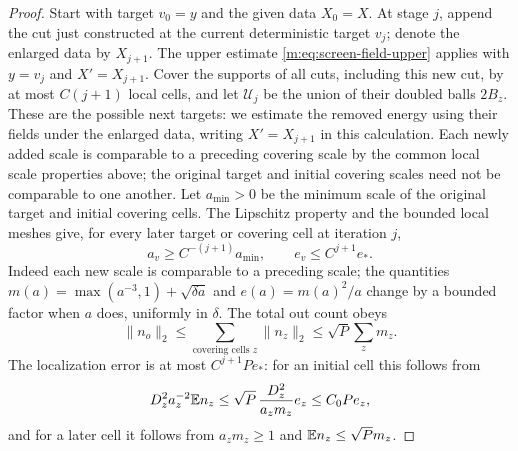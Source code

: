 \begin{proof}
Start with target $v_0=y$ and the given data $X_0=X$.  At stage $j$,
append the cut just constructed at the current deterministic target
$v_j$; denote the enlarged data by $X_{j+1}$.  The upper estimate
\eqref{m:eq:screen-field-upper} applies with $y=v_j$ and
$X'=X_{j+1}$.  Cover the supports of all cuts, including this new cut,
by at most $C(j+1)$ local cells, and let $\mathcal U_j$ be the union
of their doubled balls $2B_z$.  These are the possible next targets:
we estimate the removed energy using their fields under the enlarged
data, writing $X'=X_{j+1}$ in this calculation.
Each newly added scale is comparable to a preceding covering scale
by the common local scale properties above; the original target and
initial covering scales need not be comparable to one another.
Let $a_{\min}>0$ be the minimum scale of the original target and
initial covering cells.  The Lipschitz property and the bounded local
meshes give, for every later target or covering cell at iteration $j$,
\begin{equation}\label{a:eq:screen-chain-units}
 a_v\ge C^{-(j+1)}a_{\min},\qquad e_v\le C^{j+1}e_*.
\end{equation}
Indeed each new scale is comparable to a preceding scale; the
quantities $m(a)=\max(a^{-3},1)+\sqrt{\delta a}$ and
$e(a)=m(a)^2/a$ change by a bounded factor when $a$ does, uniformly
in $\delta$.  The total out count obeys
\begin{equation}\label{a:eq:screen-chain-count}
 \|n_o\|_2\le\sum_{\text{covering cells }z}\|n_z\|_2
                  \le\sqrt P\sum_zm_z.
\end{equation}
The localization error is at most $C^{j+1}Pe_*$:
for an initial cell this follows from
\[
 D_z^2a_z^{-2}\mathbb E n_z
 \le\sqrt P\,\frac{D_z^2}{a_zm_z}e_z\le C_0Pe_z,
\]
and for a later cell it follows from
$a_zm_z\ge1$ and $\mathbb E n_z\le\sqrt Pm_z$.


\end{proof}
